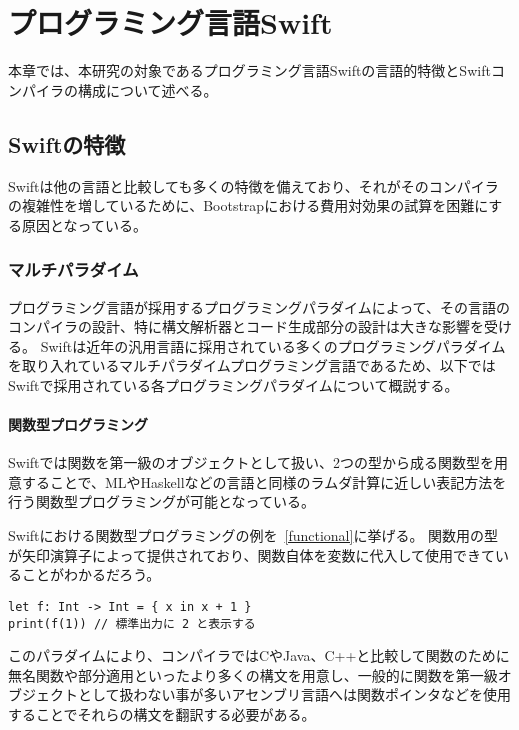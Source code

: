 \chapter{プログラミング言語Swift}
\label{explain-swift}

本章では、本研究の対象であるプログラミング言語Swiftの言語的特徴とSwiftコンパイラの構成について述べる。

\section{Swiftの特徴}

Swiftは他の言語と比較しても多くの特徴を備えており、それがそのコンパイラの複雑性を増しているために、Bootstrapにおける費用対効果の試算を困難にする原因となっている。

\subsection{マルチパラダイム}

プログラミング言語が採用するプログラミングパラダイムによって、その言語のコンパイラの設計、特に構文解析器とコード生成部分の設計は大きな影響を受ける。
Swiftは近年の汎用言語に採用されている多くのプログラミングパラダイムを取り入れているマルチパラダイムプログラミング言語であるため、以下ではSwiftで採用されている各プログラミングパラダイムについて概説する。

\subsubsection{関数型プログラミング}

Swiftでは関数を第一級のオブジェクトとして扱い、2つの型から成る関数型を用意することで、MLやHaskellなどの言語と同様のラムダ計算に近しい表記方法を行う関数型プログラミングが可能となっている。

Swiftにおける関数型プログラミングの例を~\ref{functional}に挙げる。
関数用の型が矢印演算子によって提供されており、関数自体を変数に代入して使用できていることがわかるだろう。

\begin{lstlisting}[caption=Swiftにおける関数型プログラミングの例, label=functional]
let f: Int -> Int = { x in x + 1 }
print(f(1)) // 標準出力に 2 と表示する
\end{lstlisting}

このパラダイムにより、コンパイラではCやJava、C++と比較して関数のために無名関数や部分適用といったより多くの構文を用意し、一般的に関数を第一級オブジェクトとして扱わない事が多いアセンブリ言語へは関数ポインタなどを使用することでそれらの構文を翻訳する必要がある。


